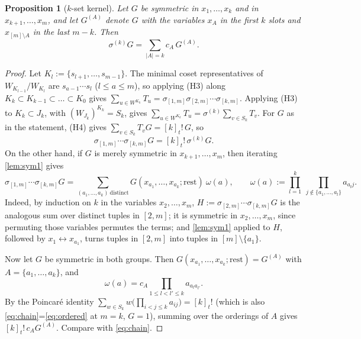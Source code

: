 \documentclass[11pt]{amsart}
\newtheorem{proposition}[theorem]{Proposition}
\theoremstyle{definition}
\theoremstyle{remark}
\numberwithin{equation}{section}
\begin{document}
\begin{proposition}[$k$-set kernel]\label{prop:Kk}
Let $G$ be symmetric in $x_1,\dots,x_k$ and in $x_{k+1},\dots,x_m$, and let $G^{(A)}$ denote $G$ with the variables $x_A$ in the first $k$ slots and $x_{[m]\setminus A}$ in the last $m-k$. Then
\[ \sigma^{(k)}G=\sum_{|A|=k}c_A\,G^{(A)} . \]
\end{proposition}
\begin{proof}
Let $K_l:=\{s_{l+1},\dots,s_{m-1}\}$. The minimal coset representatives of $W_{K_{l-1}}/W_{K_l}$ are $s_{a-1}\cdots s_l$ ($l\le a\le m$), so applying (H3) along $K_k\subset K_{k-1}\subset\dots\subset K_0$ gives $\sum_{u\in W^{K_k}}T_u=\sigma_{[1,m]}\sigma_{[2,m]}\cdots\sigma_{[k,m]}$. Applying (H3) to $K_k\subset J_k$, with $(W_{J_k})^{K_k}=S_k$, gives $\sum_{u\in W^{K_k}}T_u=\sigma^{(k)}\sum_{v\in S_k}T_v$. For $G$ as in the statement, (H4) gives $\sum_{v\in S_k}T_vG=[k]_t!\,G$, so
\begin{equation}\label{eq:chain}
\sigma_{[1,m]}\cdots\sigma_{[k,m]}G=[k]_t!\,\sigma^{(k)}G .
\end{equation}
On the other hand, if $G$ is merely symmetric in $x_{k+1},\dots,x_m$, then iterating \cref{lem:sym1} gives
\begin{equation}\label{eq:ordered}
\sigma_{[1,m]}\cdots\sigma_{[k,m]}G=\sum_{(a_1,\dots,a_k)\ \text{distinct}}G(x_{a_1},\dots,x_{a_k};\text{rest})\ \omega(a),\qquad \omega(a):=\prod_{l=1}^k\ \prod_{j\notin\{a_1,\dots,a_l\}}a_{a_lj}.
\end{equation}
Indeed, by induction on $k$ in the variables $x_2,\dots,x_m$, $H:=\sigma_{[2,m]}\cdots\sigma_{[k,m]}G$ is the analogous sum over distinct tuples in $[2,m]$; it is symmetric in $x_2,\dots,x_m$, since permuting those variables permutes the terms; and \cref{lem:sym1} applied to $H$, followed by $x_1\leftrightarrow x_{a_1}$, turns tuples in $[2,m]$ into tuples in $[m]\setminus\{a_1\}$.

Now let $G$ be symmetric in both groups. Then $G(x_{a_1},\dots,x_{a_k};\text{rest})=G^{(A)}$ with $A=\{a_1,\dots,a_k\}$, and
\begin{equation}\label{eq:omega-split}
\omega(a)=c_A\prod_{1\le l<l'\le k}a_{a_la_{l'}} .
\end{equation}
By the Poincar\'e identity $\sum_{w\in S_k}w\bigl(\prod_{i<j\le k}a_{ij}\bigr)=[k]_t!$ \cite[III (1.4)]{Macdonald95} (which is also \eqref{eq:chain}=\eqref{eq:ordered} at $m=k$, $G=1$), summing over the orderings of $A$ gives $[k]_t!\,c_AG^{(A)}$. Compare with \eqref{eq:chain}.
\end{proof}
\end{document}
